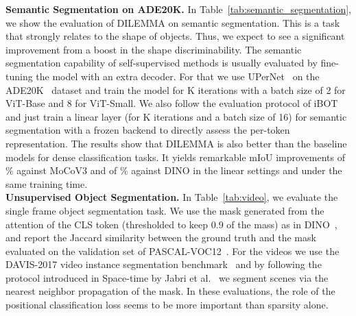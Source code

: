 \documentclass[letterpaper]{article} \usepackage{aaai23}  \usepackage{times}  \usepackage{helvet}  \usepackage{courier}  \usepackage[hyphens]{url}  \usepackage{graphicx} \urlstyle{rm} \def\UrlFont{\rm}  \usepackage{natbib}  \usepackage{caption} \frenchspacing  \setlength{\pdfpagewidth}{8.5in}  \setlength{\pdfpageheight}{11in}  \usepackage{algorithm}
\newcommand{\methodname}{DILEMMA}
\begin{document}
\noindent\textbf{Semantic Segmentation on ADE20K.}
In Table~\ref{tab:semantic_segmentation}, we show the evaluation of {\methodname} on semantic segmentation.
This is a task that strongly relates to the shape of objects. Thus, we expect to see a significant improvement from a boost in the shape discriminability. The semantic segmentation capability of self-supervised methods is usually evaluated by fine-tuning the model with an extra decoder. For that we use UPerNet~\cite{xiao2018unified} on the ADE20K~\cite{zhou2017scene} dataset and train the model for K iterations with a batch size of 2 for ViT-Base and 8 for ViT-Small. We also follow the evaluation protocol of iBOT~\cite{zhou2021ibot} and just train a linear layer (for K iterations and a batch size of 16) for semantic segmentation with a frozen backend to directly assess the per-token representation. The results show that {\methodname} is also better than the baseline models for dense classification tasks. It yields remarkable mIoU improvements of \% against MoCoV3 and of \% against DINO in the linear settings and under the same training time.\\

\noindent\textbf{Unsupervised Object Segmentation.}
In Table~\ref{tab:video}, we evaluate the single frame object segmentation task. We use the mask generated from the attention of the CLS token (thresholded to keep 0.9 of the mass) as in DINO~\cite{caron2021emerging}, and report the Jaccard similarity between the ground truth and the mask evaluated on the validation set of PASCAL-VOC12~\cite{Everingham2009ThePV}. For the videos we use the DAVIS-2017 video instance segmentation benchmark~\cite{Pont-Tuset_arXiv_2017} and by following the protocol introduced in Space-time by Jabri et al.~\cite{jabri2020space} we segment scenes via the nearest neighbor propagation of the mask. In these evaluations, the role of the positional classification loss seems to be more important than sparsity alone.\\
\end{document}
